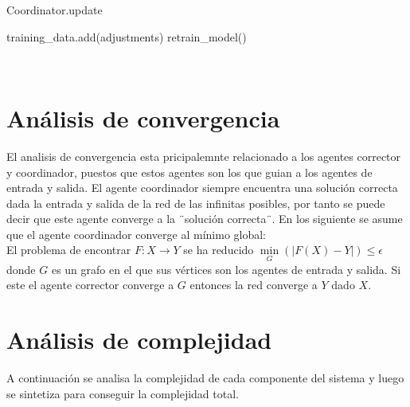 \documentclass{article}
\begin{document}
 \begin{algorithm}[H]
 \caption{Coordinator.update}
 training\_data.add(adjustments)\;
 retrain\_model()\;
 \end{algorithm} \\

\newpage


 \section*{Análisis de convergencia}
 
    El analisis de convergencia esta pricipalemnte relacionado a los agentes corrector y coordinador, puestos que estos agentes son los que guian a los agentes 
    de entrada y salida. El agente coordinador siempre encuentra una solución correcta dada la entrada y salida de la red de las infinitas posibles, por tanto se 
    puede decir que este agente converge a la ¨solución correcta¨. En los siguiente se asume que el agente coordinador converge al mínimo global: \\

    El problema de encontrar $F:X \rightarrow Y$ se ha reducido $\underset{G}{\min}(|F(X)-Y|) \leq \epsilon$ donde $G$ es un grafo en el que sus vértices son los agentes de entrada y salida. Si 
    este el agente corrector converge a $G$  entonces la red converge a $Y$ dado $X$.


 \section*{Análisis de complejidad}

    A continuación se analisa la complejidad de cada componente del sistema y luego se sintetiza para conseguir la complejidad total. \\
\end{document}
